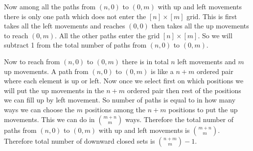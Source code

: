 \documentclass[a4paper, 11pt]{article}
\begin{document}
{Now among all the paths from $(n,0)$ to $(0,m)$ with up and left movements there is only one path which does not enter the $[n]\times [m]$ grid. This is first takes all the left movements and reaches $(0,0)$ then takes all the up movements to reach $(0,m)$. All the other paths enter the grid $[n]\times [m]$. So we will subtract 1 from the total number of paths from $(n,0)$ to $(0,m)$. 

Now to reach  from $(n,0)$ to $(0,m)$ there is in total $n$ left movements and $m$ up movements. A path from $(n,0)$ to $(0,m)$ is like a $n+m$ ordered pair where each element is up or left. Now once we select first on which positions we will put the up movements in the $n+m$ ordered pair then rest of the positions we can fill up by left movement. So number of paths is equal to in how many ways we can choose the $m$ positions among the $n+m$ positions to put the up movements. This we can do in $\binom{m+n}{m}$ ways. Therefore the total number of paths from $(n,0)$ to $(0,m)$ with up and left movements is $\binom{m+n}{m}$. Therefore total number of downward closed sets is $\binom{n+m}{m}-1$.
}
\end{document}
